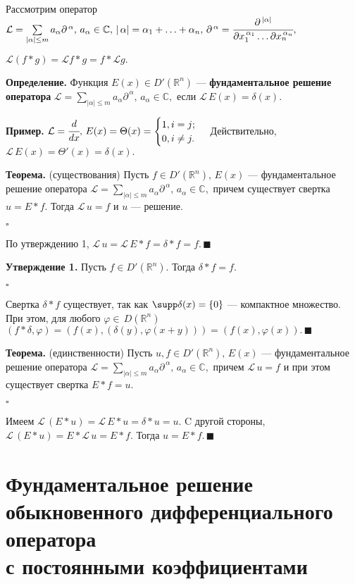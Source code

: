 \documentclass[12pt,a4paper,draft]{article}
\DeclareRobustCommand*{\т}{~--- }
\DeclareRobustCommand*{\ч}{~-- }
\begin{document}
Рассмотрим оператор $\mathcal L=\sum\limits_{|\alpha|\le
m}a_{\alpha}{\partial^{\, \alpha}},\, a_{\alpha}\in \mathbb C,\,
|\,\alpha|=\alpha_1+\ldots+\alpha_n, \,\partial^{\,\alpha}=\cfrac
{\partial^{\,|\alpha|}}{\partial x_1^{\,\alpha_1}\ldots
\partial x_n^{\,\alpha_n}},$

$\mathcal L(f*g)=\mathcal L f*g=f*\mathcal L g.$

\textbf{Определение.} Функция $E(x)\in D'(\mathbb R^n)$
--- \textbf{фундаментальное решение оператора}
$\mathcal L=\sum\limits_{|\alpha|\le m}a_{\alpha}{\partial^{\,
\alpha}},\, a_{\alpha}\in \mathbb C,$ если $\mathcal
L\,E(x)=\delta(x).$

\textbf{Пример.} $\mathcal L=\cfrac d{dx},\,
E(x)=\Theta(x)=\begin{cases} 1, i=j;\\ 0, i \ne j.\end{cases}$
Действительно, $\mathcal L\,E(x)=\Theta'(x)=\delta(x).$

\textbf{Теорема.} (существования) Пусть $f\in D'(\mathbb R^n),\,
E(x)$ --- фундаментальное решение оператора $\mathcal
L=\sum\limits_{|\alpha|\le m}a_{\alpha}{\partial^{\, \alpha}},\,
a_{\alpha}\in \mathbb C,$ причем существует свертка $u=E*f.$ Тогда
$\mathcal L\,u=f$ и $u$ --- решение.

$\square$

По утверждению 1, $\mathcal L\,u=\mathcal
L\,E*f=\delta*f=f.\,\blacksquare$

\textbf{Утверждение 1.} Пусть $f\in D'(\mathbb R^n).$ Тогда
$\delta*f=f.$

$\square$

Свертка $\delta*f$ существует, так как $\supp \delta(x)=\{0\}$ ---
компактное множество. При этом, для любого $\varphi\in\,D(\mathbb
R^n)$
$(f*\delta,\varphi)=(f(x),(\delta(y),\varphi(x+y)))=(f(x),\varphi(x)).\,\blacksquare$

\textbf{Теорема.} (единственности) Пусть $u,f\in D'(\mathbb
R^n),\, E(x)$ --- фундаментальное решение оператора $\mathcal
L=\sum\limits_{|\alpha|\le m}a_{\alpha}{\partial^{\, \alpha}},\,
a_{\alpha}\in \mathbb C,$ причем $\mathcal L\,u=f$ и при этом
существует свертка $E*f=u.$

$\square$

Имеем $\mathcal L\,(E*u)=\mathcal L\,E*u=\delta*u=u.$ C другой
стороны, $\mathcal L\,(E*u)=E*\mathcal L\,u=E*f$. Тогда
$u=E*f.\,\blacksquare$

\section{Фундаментальное решение обыкновенного дифференциального оператора\\
с постоянными коэффициентами}
\end{document}
